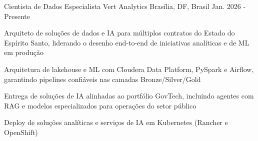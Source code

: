 

\begin{cventries}

  \cventry
    {Cientista de Dados Especialista} %
    {Vert Analytics} %
    {Brasília, DF, Brasil} %
    {Jan. 2026 - Presente} %
    {
      \begin{cvitems} %
        \item {Arquiteto de soluções de dados e IA para múltiplos contratos do Estado do Espírito Santo, liderando o desenho end-to-end de iniciativas analíticas e de ML em produção}
        \item {Arquitetura de lakehouse e ML com Cloudera Data Platform, PySpark e Airflow, garantindo pipelines confiáveis nas camadas Bronze/Silver/Gold}
        \item {Entrega de soluções de IA alinhadas ao portfólio GovTech, incluindo agentes com RAG e modelos especializados para operações do setor público}
        \item {Deploy de soluções analíticas e serviços de IA em Kubernetes (Rancher e OpenShift)}
      \end{cvitems}
    }


\end{cventries}
